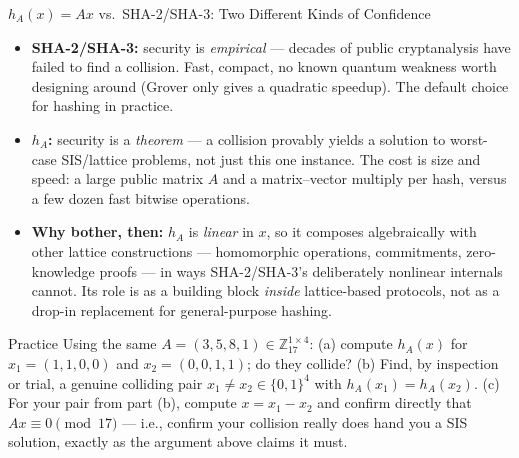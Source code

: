 \begin{factbox}{$h_A(x) = Ax$ vs.\ SHA-2/SHA-3: Two Different Kinds of Confidence}
\begin{itemize}[leftmargin=*]
  \item \textbf{SHA-2/SHA-3:} security is \emph{empirical} --- decades of public cryptanalysis have failed to find a collision. Fast, compact, no known quantum weakness worth designing around (Grover only gives a quadratic speedup). The default choice for hashing in practice.
  \item \textbf{$h_A$:} security is a \emph{theorem} --- a collision provably yields a solution to worst-case SIS/lattice problems, not just this one instance. The cost is size and speed: a large public matrix $A$ and a matrix--vector multiply per hash, versus a few dozen fast bitwise operations.
  \item \textbf{Why bother, then:} $h_A$ is \emph{linear} in $x$, so it composes algebraically with other lattice constructions --- homomorphic operations, commitments, zero-knowledge proofs --- in ways SHA-2/SHA-3's deliberately nonlinear internals cannot. Its role is as a building block \emph{inside} lattice-based protocols, not as a drop-in replacement for general-purpose hashing.
\end{itemize}
\end{factbox}

\begin{exercisebox}{Practice}
Using the same $A = (3,5,8,1) \in \mathbb{Z}_{17}^{1\times 4}$: (a) compute $h_A(x)$ for $x_1=(1,1,0,0)$ and $x_2=(0,0,1,1)$; do they collide? (b) Find, by inspection or trial, a genuine colliding pair $x_1 \ne x_2 \in \{0,1\}^4$ with $h_A(x_1)=h_A(x_2)$. (c) For your pair from part (b), compute $x=x_1-x_2$ and confirm directly that $Ax\equiv 0\pmod{17}$ --- i.e., confirm your collision really does hand you a SIS solution, exactly as the argument above claims it must.
\end{exercisebox}

